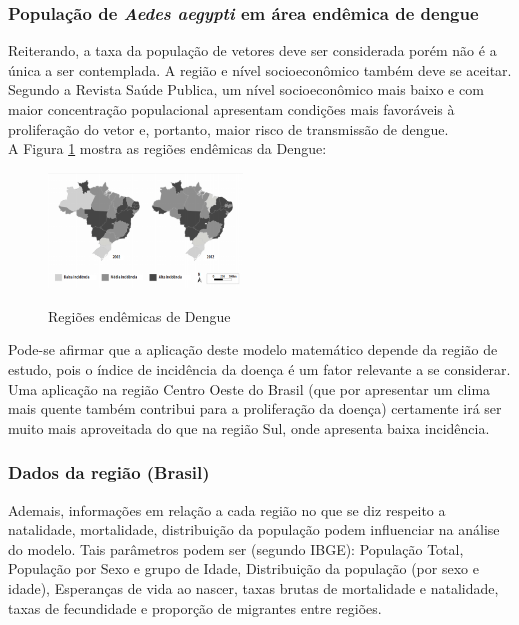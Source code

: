 \documentclass[conference]{IEEEtran}
\begin{document}
\subsubsection{População de \textit{Aedes aegypti} em área endêmica de dengue}

Reiterando, a taxa da população de vetores deve ser considerada porém não é a única a ser contemplada. A região e nível socioeconômico também deve se aceitar. Segundo a Revista Saúde Publica\cite{barata2001aedes}, um nível socioeconômico mais baixo e com maior concentração populacional apresentam condições mais favoráveis à proliferação do vetor e, portanto, maior risco de transmissão de dengue.\\

A Figura \ref{fig:regioes} mostra as regiões endêmicas da Dengue:

\begin{figure}[!ht]
  \caption{Regiões endêmicas de Dengue\cite{bohm2016dengue}}
  \includegraphics[width=0.46\textwidth]{regiaoendemica.png}
  \label{fig:regioes}
\end{figure}

Pode-se afirmar que a aplicação deste modelo matemático depende da região de estudo, pois o índice de incidência da doença é um fator relevante a se considerar. Uma aplicação na região Centro Oeste do Brasil (que por apresentar um clima mais quente também contribui para a proliferação da doença) certamente irá ser muito mais aproveitada do que na região Sul, onde apresenta baixa incidência.

\subsubsection{Dados da região (Brasil)}

Ademais, informações em relação a cada região no que se diz respeito a natalidade, mortalidade, distribuição da população podem influenciar na análise do modelo. Tais parâmetros podem ser (segundo IBGE): População Total, População por Sexo e grupo de Idade, Distribuição da população (por sexo e idade), Esperanças de vida ao nascer, taxas brutas de mortalidade e natalidade, taxas de fecundidade e proporção de migrantes entre regiões.\\
\end{document}
